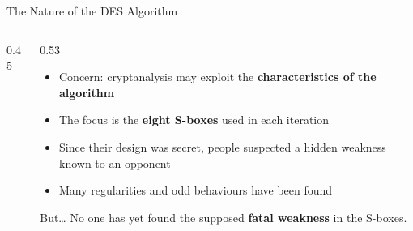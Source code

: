 \documentclass[aspectratio=169,11pt,xcolor={table}]{beamer}
\begin{document}
\begin{frame}{The Nature of the DES Algorithm}
  \begin{columns}[c]
    \begin{column}{0.45\textwidth}
      \centering
    \end{column}
    \begin{column}{0.53\textwidth}
      \begin{itemize}\small\setlength{\itemsep}{4pt}
        \item Concern: cryptanalysis may exploit the \textbf{characteristics of the algorithm}
        \item The focus is the \textbf{eight S-boxes} used in each iteration
        \item Since their design was secret, people suspected a hidden weakness known to an opponent
        \item Many regularities and odd behaviours have been found
      \end{itemize}
      \begin{exampleblock}{But\dots}
        \small No one has yet found the supposed \textbf{fatal weakness} in the S-boxes.
      \end{exampleblock}
    \end{column}
  \end{columns}
\end{frame}
\end{document}
